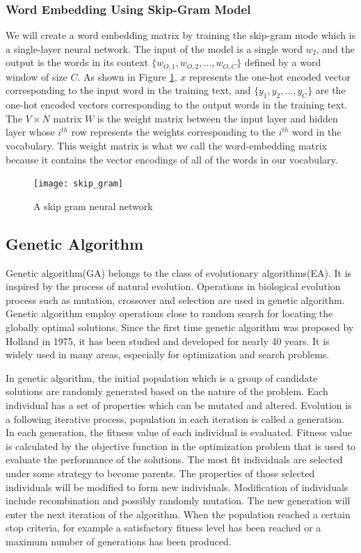 \subsubsection {Word Embedding Using Skip-Gram Model}
We will create a word embedding matrix by training the skip-gram mode which is a single-layer neural network. 
%
 The input of the model is a single word $w_I$, and the output is the words in its context $\{w_{O,1},w_{O,2}, \dots, w_{O,C}\}$ defined by a word window of size $C$.
%
As shown in Figure \ref{fig:skip_gram},  $x$ represents the one-hot encoded vector corresponding to the
input word in the training text,
%
 and $\{y_1, y_2, \dots, y_C\}$ are the one-hot encoded vectors corresponding to the output words in the training text.
 The $V \times N$ matrix $W$ is the weight matrix between the input layer and hidden layer whose
$i^{th}$ row represents the weights corresponding to the $i^{th}$ word in the vocabulary. 
%
This weight matrix is what we call the word-embedding matrix because it contains the
vector encodings of all of the words in our vocabulary.

\begin{figure}[htb]
	\centering
	\texttt{[image: skip\_gram]}
	\caption{A skip gram neural network}
	\label{fig:skip_gram}
\end{figure} 
 
\subsection{Genetic Algorithm}
Genetic algorithm(GA) belongs to the class of evolutionary algorithms(EA).
%
It is inspired by the process of natural evolution. Operations in biological evolution process such as mutation, crossover and selection are used in genetic algorithm\cite{banzhaf1998genetic}.
%
Genetic algorithm employ operations close to random search for locating the globally optimal solutions.
%
Since the first time genetic algorithm was proposed by Holland\cite{holland1975adaptation} in 1975, it has been studied and developed for nearly 40 years.
%
It is widely used in many areas, especially for optimization and search problems.


In genetic algorithm, the initial population which is a group of candidate solutions are randomly generated based on the nature of the problem.
%
Each individual has a set of properties which can be mutated and altered.
%
Evolution is a following iterative process, population in each iteration is called a generation.
%
In each generation, the fitness value of each individual is evaluated.
%
Fitness value is calculated by the objective function in the optimization problem that is used to evaluate the performance of the solutions.
%
The most fit individuals are selected under some strategy to become parents. The properties of those selected individuals will be modified to form new individuals.
%
Modification of individuals include recombination and possibly randomly mutation.
%
The new generation will enter the next iteration of the algorithm.
%
When the population reached a certain stop criteria, for example a satisfactory fitness level has been reached or a maximum number of generations has been produced.
 
